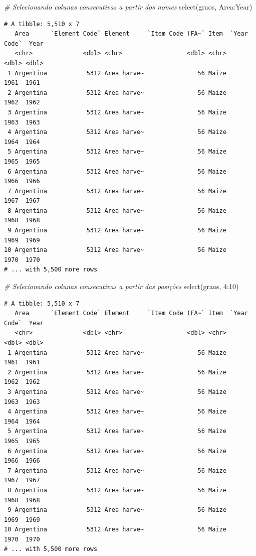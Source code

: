 \documentclass[
  brazilian,
]{book}
\newenvironment{Shaded}{\begin{snugshade}}{\end{snugshade}}
\newcommand{\CommentTok}[1]{\textcolor[rgb]{0.56,0.35,0.01}{\textit{#1}}}
\newcommand{\DecValTok}[1]{\textcolor[rgb]{0.00,0.00,0.81}{#1}}
\newcommand{\FunctionTok}[1]{\textcolor[rgb]{0.00,0.00,0.00}{#1}}
\newcommand{\NormalTok}[1]{#1}
\newcommand{\SpecialCharTok}[1]{\textcolor[rgb]{0.00,0.00,0.00}{#1}}
\begin{document}
\begin{Shaded}
\begin{Highlighting}[]
\CommentTok{\# Selecionando colunas consecutivas a partir dos nomes}
\FunctionTok{select}\NormalTok{(graos,}
\NormalTok{       Area}\SpecialCharTok{:}\NormalTok{Year)}
\end{Highlighting}
\end{Shaded}

\begin{verbatim}
# A tibble: 5,510 x 7
   Area      `Element Code` Element     `Item Code (FA~` Item  `Year Code`  Year
   <chr>              <dbl> <chr>                  <dbl> <chr>       <dbl> <dbl>
 1 Argentina           5312 Area harve~               56 Maize        1961  1961
 2 Argentina           5312 Area harve~               56 Maize        1962  1962
 3 Argentina           5312 Area harve~               56 Maize        1963  1963
 4 Argentina           5312 Area harve~               56 Maize        1964  1964
 5 Argentina           5312 Area harve~               56 Maize        1965  1965
 6 Argentina           5312 Area harve~               56 Maize        1966  1966
 7 Argentina           5312 Area harve~               56 Maize        1967  1967
 8 Argentina           5312 Area harve~               56 Maize        1968  1968
 9 Argentina           5312 Area harve~               56 Maize        1969  1969
10 Argentina           5312 Area harve~               56 Maize        1970  1970
# ... with 5,500 more rows
\end{verbatim}

\begin{Shaded}
\begin{Highlighting}[]
\CommentTok{\# Selecionando colunas consecutivas a partir das posições}
\FunctionTok{select}\NormalTok{(graos, }\DecValTok{4}\SpecialCharTok{:}\DecValTok{10}\NormalTok{)}
\end{Highlighting}
\end{Shaded}

\begin{verbatim}
# A tibble: 5,510 x 7
   Area      `Element Code` Element     `Item Code (FA~` Item  `Year Code`  Year
   <chr>              <dbl> <chr>                  <dbl> <chr>       <dbl> <dbl>
 1 Argentina           5312 Area harve~               56 Maize        1961  1961
 2 Argentina           5312 Area harve~               56 Maize        1962  1962
 3 Argentina           5312 Area harve~               56 Maize        1963  1963
 4 Argentina           5312 Area harve~               56 Maize        1964  1964
 5 Argentina           5312 Area harve~               56 Maize        1965  1965
 6 Argentina           5312 Area harve~               56 Maize        1966  1966
 7 Argentina           5312 Area harve~               56 Maize        1967  1967
 8 Argentina           5312 Area harve~               56 Maize        1968  1968
 9 Argentina           5312 Area harve~               56 Maize        1969  1969
10 Argentina           5312 Area harve~               56 Maize        1970  1970
# ... with 5,500 more rows
\end{verbatim}
\end{document}
